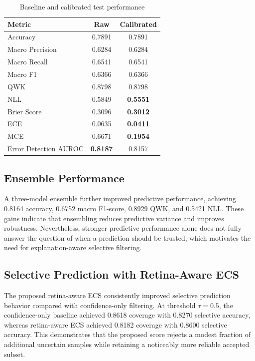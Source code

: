 \documentclass[conference]{IEEEtran}
\begin{document}
\begin{table}[!t]
\centering
\caption{Baseline and calibrated test performance}
\label{tab:baseline_calibration}
\renewcommand{\arraystretch}{1.08}
\setlength{\tabcolsep}{4pt}
\begin{tabular}{lcc}
\toprule
Metric & Raw & Calibrated \\
\midrule
Accuracy & 0.7891 & 0.7891 \\
Macro Precision & 0.6284 & 0.6284 \\
Macro Recall & 0.6541 & 0.6541 \\
Macro F1 & 0.6366 & 0.6366 \\
QWK & 0.8798 & 0.8798 \\
NLL & 0.5849 & \textbf{0.5551} \\
Brier Score & 0.3096 & \textbf{0.3012} \\
ECE & 0.0635 & \textbf{0.0411} \\
MCE & 0.6671 & \textbf{0.1954} \\
Error Detection AUROC & \textbf{0.8187} & 0.8157 \\
\bottomrule
\end{tabular}
\end{table}

\subsection{Ensemble Performance}
A three-model ensemble further improved predictive performance, achieving 0.8164 accuracy, 0.6752 macro F1-score, 0.8929 QWK, and 0.5421 NLL. These gains indicate that ensembling reduces predictive variance and improves robustness. Nevertheless, stronger predictive performance alone does not fully answer the question of when a prediction should be trusted, which motivates the need for explanation-aware selective filtering.

\subsection{Selective Prediction with Retina-Aware ECS}
The proposed retina-aware ECS consistently improved selective prediction behavior compared with confidence-only filtering. At threshold $\tau = 0.5$, the confidence-only baseline achieved 0.8618 coverage with 0.8270 selective accuracy, whereas retina-aware ECS achieved 0.8182 coverage with 0.8600 selective accuracy. This demonstrates that the proposed score rejects a modest fraction of additional uncertain samples while retaining a noticeably more reliable accepted subset.
\end{document}
